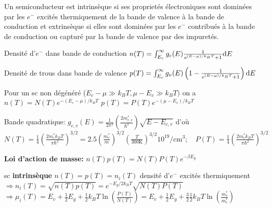 Un semiconducteur est intrinsèque si ses proprietés électroniques sont dominées par les $e^-$ excités thermiquement de la bande de valence à la bande de conduction et extrinsèque si elles sont dominées par les $e^-$ contribués à la bande de conduction ou capturé par la bande de valence par des impuretés.
\begin{squishlist}
    \item Densité d'$e^-$ dans bande de conduction $n(T) = \int_{E_c}^{\infty} g_c(E) \frac{1}{e^{(E-\mu)/k_B T} + 1} \textrm{d} E$
    \item Densité de trous dans bande de valence $p(T) =\int_{E_c}^{\infty} g_v(E)\left( 1- \frac{1}{e^{(E-\mu)/k_B T} + 1} \right)\textrm{d} E$
    \item Pour un sc non dégénéré ($E_c - \mu \gg k_B T, \mu -E_v \gg k_B T)$ on a \\ $n(T) = N(T) e^{-(E_c - \mu) / k_B T}$ \quad $p(T) = P(T) e^{-(\mu - E_v) / k_B T}$
    \item Bande quadratique: $g_{c,v}(E) = \frac{1}{2 \pi^2}\left( \frac{2m^*_{c,v}}{\hbar^2}\right) \sqrt{E - E_{c,v}}$
    d'où \\
    $N(T) = \frac{1}{4} \left( \frac{2 m_c^* k_B T}{\pi \hbar^2}\right)^{3/2}=2.5 \left(\frac{m_c^*}{m}\right)^{3/2} \left(\frac{T}{300 \mathrm{K}}\right)^{3/2} 10^{19}/\mathrm{cm}^3; \quad P(T) = \frac{1}{4} \left( \frac{2 m_v^* k_B T}{\pi \hbar^2}\right)^{3/2}$
    \item \textbf{Loi d'action de masse:} $n(T)p(T) = N(T)P(T) e^{-\beta E_g}$
    \item sc \textbf{intrinsèque} $n(T) = p(T) = n_i(T)$ \quad densité d'$e^-$ excités thermiquement \\
    $\Longrightarrow n_i(T) = \sqrt{n(T) p(T)} = e^{-E_g / 2 k_B T} \sqrt{N(T) P(T)}$ \\
    $\Longrightarrow \mu_i(T) = E_v + \frac{1}{2}E_g + \frac{1}{2}k_B T \ln \left( \frac{P(T)}{N(T)}\right) = E_v + \frac{1}{2}E_g + \frac{3}{2}\frac{1}{2}k_B T \ln \left( \frac{m_v^*}{m_c^*}\right)$
\end{squishlist}

